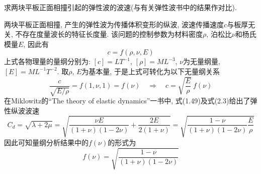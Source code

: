 \begin{problem}[25]
求两块平板正面相撞引起的弹性波的波速(与有关弹性波书中的结果作对比).
\end{problem}
\begin{solution}
两块平板正面相撞, 产生的弹性波为传播体积变形的纵波, 波速传播速度$c$与板厚无关, 不存在度量波长的特征长度量. 该问题的控制参数为材料密度$\rho$, 泊松比$\nu$和杨氏模量$E$, 因此有
\[
c = f(\rho,\nu,E)
\]
上式各物理量的量纲分别为: $[c]=LT^{-1}$, $[\rho]=ML^{-3}$, $\nu$为无量纲量, $[E]=ML^{-1}T^{-2}$. 取$\rho$, $E$为基本量, 于是上式可转化为以下无量纲关系
\[
\frac{c}{\sqrt{E/\rho}} = f(1,\nu,1) = f(\nu) 
\quad\Longrightarrow\quad
c = \sqrt{\frac{E}{\rho}}~f(\nu)
\]
在Miklowitz的``The theory of elastic dynamics''\cite{miklowitz_theory_1978}一书中, 式(1.49)及式(2.3)给出了弹性纵波波速
\[
C_d = \sqrt{\lambda+2\mu} = \sqrt{\frac{\nu E}{(1+\nu)(1-2\nu)}+\frac{2E}{2(1+\nu)}}=\sqrt{\frac{1-\nu}{(1+\nu)(1-2\nu)}\frac{E}{\rho}}
\]
因此可知量纲分析结果中的$f(\nu)$的形式为
\[
f(\nu) = \sqrt{\frac{1-\nu}{(1+\nu)(1-2\nu)}}
\]
\end{solution}
